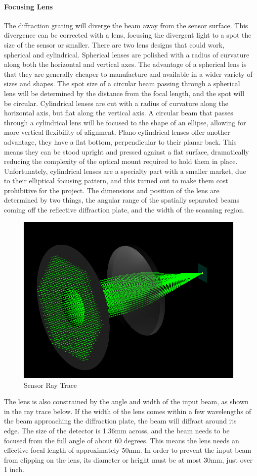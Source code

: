 \documentclass[journal]{IEEEtran}
\begin{document}
\paragraph{Focusing Lens} The diffraction grating will diverge the beam away from the sensor surface. This divergence can be corrected with a lens, focusing the divergent light to a spot the size of the sensor or smaller. There are two lens designs that could work, spherical and cylindrical. Spherical lenses are polished with a radius of curvature along both the horizontal and vertical axes. The advantage of a spherical lens is that they are generally cheaper to manufacture and available in a wider variety of sizes and shapes. The spot size of a circular beam passing through a spherical lens will be determined by the distance from the focal length, and the spot will be circular. Cylindrical lenses are cut with a radius of curvature along the horizontal axis, but flat along the vertical axis. A circular beam that passes through a cylindrical lens will be focused to the shape of an ellipse, allowing for more vertical flexibility of alignment. Plano-cylindrical lenses offer another advantage, they have a flat bottom, perpendicular to their planar back. This means they can be stood upright and pressed against a flat surface, dramatically reducing the complexity of the optical mount required to hold them in place. Unfortunately, cylindrical lenses are a specialty part with a smaller market, due to their elliptical focusing pattern, and this turned out to make them cost prohibitive for the project. The dimensions and position of the lens are determined by two things, the angular range of the spatially separated beams coming off the reflective diffraction plate, and the width of the scanning region. 

\begin{figure}[H]
    \caption{Sensor Ray Trace}
    \centering
    \includegraphics[width=0.5\linewidth]{images/ColimatedBeam.png}
\end{figure}

The lens is also constrained by the angle and width of the input beam, as shown in the ray trace below. If the width of the lens comes within a few wavelengths of the beam approaching the diffraction plate, the beam will diffract around its edge. The size of the detector is 1.36mm across, and the beam needs to be focused from the full angle of about 60 degrees. This means the lens needs an effective focal length of approximately 50mm. In order to prevent the input beam from clipping on the lens, its diameter or height must be at most 30mm, just over 1 inch. 
\end{document}
